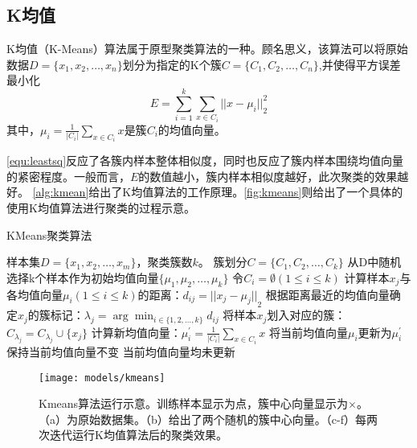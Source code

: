 \subsection{K均值}
K均值（K-Means）算法属于原型聚类算法的一种\cite{Zhou2016,Liu2018}。顾名思义，该算法可以将原始数据$D=\{x_1,x_2,\dots,x_n\}$划分为指定的K个簇$C=\{C_1,C_2,\dots,C_n\}$,并使得平方误差最小化
\begin{equation}
    \label{equ:leastsq}
    E=\sum_{i=1}^k \sum_{x \in C_i}{||x- \mu_i||}_2^2
\end{equation}
其中，$\mu_i = \frac{1}{|C_i|} \sum_{x \in C_i}{x}$是簇$C_i$的均值向量。

\autoref{equ:leastsq}反应了各簇内样本整体相似度，同时也反应了簇内样本围绕均值向量的紧密程度。一般而言，$E$的数值越小，簇内样本相似度越好，此次聚类的效果越好。
\autoref{alg:kmean}给出了K均值算法的工作原理。\autoref{fig:kmeans}则给出了一个具体的使用K均值算法进行聚类的过程示意。
\begin{breakablealgorithm}
    \caption[KMeans聚类算法]{KMeans聚类算法\cite{Zhou2016}}
    \label{alg:kmean}
    \begin{algorithmic}[1] %
        \Require 样本集$D=\{x_1,x_2,\dots,x_m\}$，聚类簇数$k$。
        \Ensure 簇划分$C=\{C_1,C_2,\dots,C_k\}$
        \State 从D中随机选择k个样本作为初始均值向量$\{\mu_1,\mu_2,\dots,\mu_k\}$
        \Repeat
        \State 令$C_i=\emptyset (1\le i\le k)$
                \State 计算样本$x_j$与各均值向量$\mu_i (1\le i \le k)$的距离：$d_{ij}={||x_j - \mu_j||}_2$
                \State 根据距离最近的均值向量确定$x_j$的簇标记：$\lambda_j = \arg \min_{i \in \{1,2,\dots,k\}} d_{ij}$
                \State 将样本$x_j$划入对应的簇：$C_{\lambda_j} = C_{\lambda_j} \cup \{x_j\}$
            \EndFor
                \State 计算新均值向量：$\mu_i^{'}=\frac{1}{|C_i|} \sum_{x \in C_i}{x}$
                    \State 将当前均值向量$\mu_i$更新为$\mu_i^{'}$
                \Else
                    \State 保持当前均值向量不变
                \EndIf
            \EndFor
        \Until 当前均值向量均未更新
    \end{algorithmic}
\end{breakablealgorithm}
\begin{figure}[htbp]
    \centering
    \texttt{[image: models/kmeans]}
    \caption[Kmeans算法运行示意]{\label{fig:kmeans}Kmeans算法运行示意\cite{kmeans}。训练样本显示为点，簇中心向量显示为$\times$。（a）为原始数据集。（b）给出了两个随机的簇中心向量。（c-f）每两次迭代运行K均值算法后的聚类效果。}
\end{figure}

